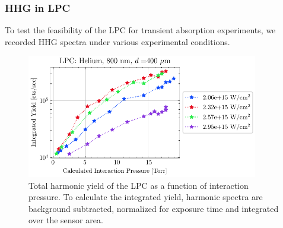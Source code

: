 




\subsubsection{HHG in LPC}

To test the feasibility of the LPC for transient absorption experiments, we recorded HHG spectra under various experimental conditions.

\begin{figure}
	\centering
	\includegraphics[width=0.90\textwidth]{figures/chap3/LPC_P_scaling_He800.pdf}
	\caption{Total harmonic yield of the LPC as a function of interaction pressure. To calculate the integrated yield, harmonic spectra are background subtracted, normalized for exposure time and integrated over the sensor area.}
	\label{fig:LPC_performance}
\end{figure}


